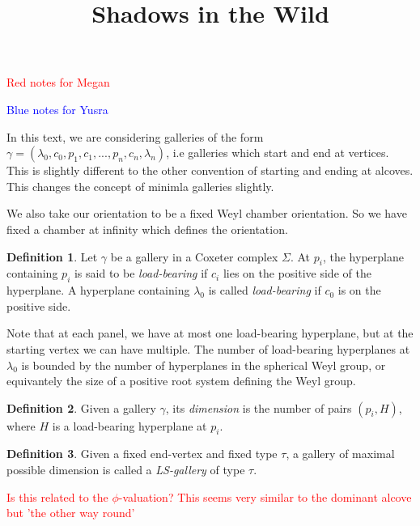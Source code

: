 \documentclass[11pt]{article}
\begin{document}
\newtheorem{theorem}{Theorem}
\theoremstyle{definition}
\newtheorem{definition}{Definition}
\newtheorem{proposition}{Proposition}
\newtheorem{example}{Example}
\newtheorem{lemma}{Lemma}
\newtheorem{corollary}{Corollary}
\newcommand{\uw}{\mathcal{U}(W,X)}
\newcommand{\W}{$(W,S)$}
\newcommand{\ix}{\textit}
\newcommand{\tr}{\textcolor{red}}
\newcommand{\sg}{$\Sigma$}


\title{Shadows in the Wild}
\maketitle
\tableofcontents 



\textcolor{red}{Red notes for Megan}

\textcolor{blue}{Blue notes for Yusra}



In this text, we are considering galleries of the form $\gamma=(\lambda_0,c_0,p_1,c_1,...,p_n,c_n,\lambda_n)$, i.e galleries which start and end at vertices. This is slightly different to the other convention of starting and ending at alcoves. This changes the concept of minimla galleries slightly. 

We also take our orientation to be a fixed Weyl chamber orientation. So we have fixed a chamber at infinity which defines the orientation.

\begin{definition}
    Let $\gamma$ be a gallery in a Coxeter complex $\Sigma$. At $p_i$, the hyperplane containing $p_i$ is said to be \ix{load-bearing} if $c_i$ lies on the positive side of the hyperplane. A hyperplane containing $\lambda_0$ is called \ix{load-bearing} if $c_0$ is on the positive side.
\end{definition}

Note that at each panel, we have at most one load-bearing hyperplane, but at the starting vertex we can have multiple. The number of load-bearing hyperplanes at $\lambda_0$ is bounded by the number of hyperplanes in the spherical Weyl group, or equivantely the size of a positive root system defining the Weyl group. 

\begin{definition}
    Given a gallery $\gamma$, its \ix{dimension} is the number of pairs $(p_i,H)$, where $H$ is a load-bearing hyperplane at $p_i$. 
\end{definition}

\begin{definition}
    Given a fixed end-vertex and fixed type $\tau$, a gallery of maximal possible dimension is called a \ix{LS-gallery} of type $\tau$. 
\end{definition}

\tr{Is this related to the $\phi$-valuation? This seems very similar to the dominant alcove but 'the other way round'}
\end{document}

